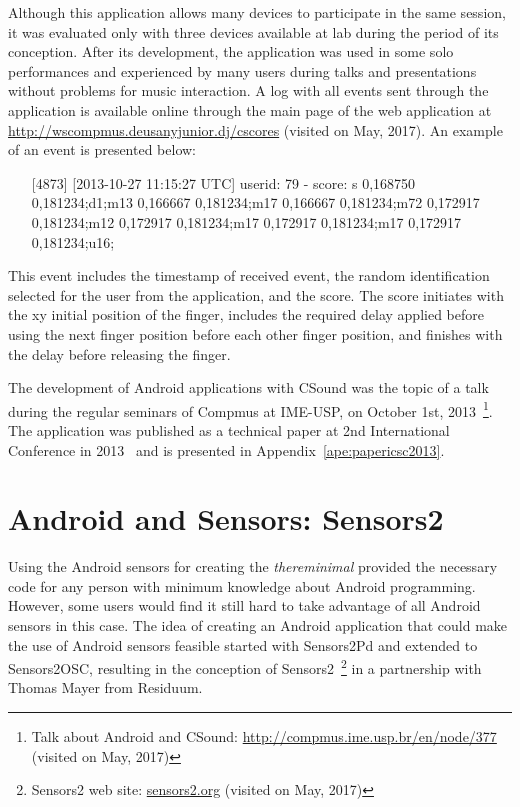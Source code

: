 Although this application allows many devices to participate in the same session, it was evaluated only with three devices available at lab during the period of its conception.
After its development, the application was used in some solo performances and experienced by many users during talks and presentations without problems for music interaction.
A log with all events sent through the application is available online through the main page of the web application at \url{http://wscompmus.deusanyjunior.dj/cscores} (visited on May, 2017).
An example of an event is presented below:

\begin{itemize}\itemsep0em
\item[] [4873] [2013-10-27 11:15:27 UTC] userid: 79 - score: s 0,168750 0,181234;d1;m13 0,166667 0,181234;m17 0,166667 0,181234;m72 0,172917 0,181234;m12 0,172917 0,181234;m17 0,172917 0,181234;m17 0,172917 0,181234;u16;
\end{itemize}

This event includes the timestamp of received event, the random identification selected for the user from the application, and the score.
The score initiates with the xy initial position of the finger, includes the required delay applied before using the next finger position before each other finger position, and finishes with the delay before releasing the finger.

The development of Android applications with CSound was the topic of a talk during the regular seminars of Compmus at IME-USP, on October 1st, 2013~\footnote{Talk about Android and CSound: \url{http://compmus.ime.usp.br/en/node/377} (visited on May, 2017)}.
The application was published as a technical paper at 2nd International Conference in 2013~\citep{deCarvalhoJunior2013touches} and is presented in Appendix~\ref{ape:papericsc2013}.


\section{Android and Sensors: Sensors2}
\label{apesec:appsensors2}

Using the Android sensors for creating the \textit{thereminimal} provided the necessary code for any person with minimum knowledge about Android programming.
However, some users would find it still hard to take advantage of all Android sensors in this case. %
The idea of creating an Android application that could make the use of Android sensors feasible started with Sensors2Pd and extended to Sensors2OSC, resulting in the conception of Sensors2~\footnote{Sensors2 web site: \url{sensors2.org} (visited on May, 2017)} in a partnership with Thomas Mayer from Residuum.

